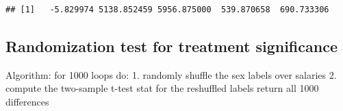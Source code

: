 \documentclass[
]{book}
\newenvironment{Shaded}{\begin{snugshade}}{\end{snugshade}}
\newcommand{\DecValTok}[1]{\textcolor[rgb]{0.00,0.00,0.81}{#1}}
\newcommand{\FunctionTok}[1]{\textcolor[rgb]{0.00,0.00,0.00}{#1}}
\newcommand{\NormalTok}[1]{#1}
\newcommand{\OtherTok}[1]{\textcolor[rgb]{0.56,0.35,0.01}{#1}}
\newcommand{\SpecialCharTok}[1]{\textcolor[rgb]{0.00,0.00,0.00}{#1}}
\begin{document}
\begin{Shaded}
\end{Shaded}

\begin{verbatim}
## [1]   -5.829974 5138.852459 5956.875000  539.870658  690.733306
\end{verbatim}

\hypertarget{randomization-test-for-treatment-significance}{%
\subsection{Randomization test for treatment significance}\label{randomization-test-for-treatment-significance}}

Algorithm:
for 1000 loops do:
1. randomly shuffle the sex labels over salaries
2. compute the two-sample t-test stat for the reshuffled labels
return all 1000 differences
\end{document}
